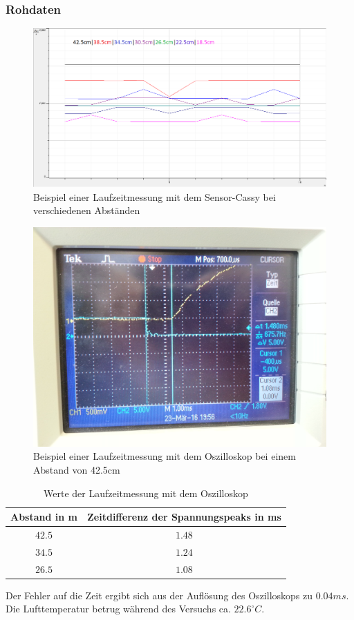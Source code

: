 \documentclass[12pt,a4paper]{article}
\begin{document}
\subsubsection{Rohdaten}
\begin{figure}[H]
\centering
\includegraphics[scale=0.6]{Bilder/Rohdaten-Laufzeitmessung.png}
\caption{Beispiel einer Laufzeitmessung mit dem Sensor-Cassy bei verschiedenen Abständen}
\label{Laufzeitrohdaten}
\end{figure}
\begin{figure}[H]
\centering
\includegraphics[scale=0.12]{Bilder/oszi.jpg}
\caption{Beispiel einer Laufzeitmessung mit dem Oszilloskop bei einem Abstand von 42.5cm}
\end{figure}
\begin{table}[H]\centering
\caption{Werte der Laufzeitmessung mit dem Oszilloskop}
\begin{tabular}{c|c}
Abstand in m & Zeitdifferenz der Spannungspeaks in ms\\ 
\hline
$42.5$& $1.48$\\ 
$34.5$& $1.24$\\
$26.5$& $1.08$\\
\end{tabular} 
\end{table}
Der Fehler auf die Zeit ergibt sich aus der Auflösung des Oszilloskops zu $0.04ms$.
Die Lufttemperatur betrug während des Versuchs ca. $22.6^{\circ}C$.
\end{document}
